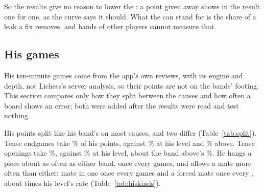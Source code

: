 \documentclass[11pt]{article}
\begin{document}
So the results give no reason to lower the \Discount: a point given away shows in the result one
for one, as the curve says it should. What the \Discount{} can stand for is the share of a leak a fix
removes, and bands of other players cannot measure that.

\begin{table}[h]
\centering
\small\DiscountTable
\caption{The rule's discount fit, over his band's player-games: $\delta$, minus the slope of the
result on the points given away with the rating difference beside them, and its 95\% interval. By
the rule every cause is \emph{too high} against the app's \Discount.}
\label{tab:discount}
\end{table}

\begin{table}[h]
\centering
\scriptsize\TheirsTable
\caption{The discount with the opponent's points (added after the results were read; not part of the
rule): the correlation of the two players' points a game, $\delta$ with the opponent's points on the
same cause beside the player's, and $\delta$ in one fit with both players' points on every partition
cause.}
\label{tab:theirs}
\end{table}

\subsection{His games}

His \ArchiveGames{} ten-minute games come from the app's own reviews, with its engine and depth, not
Lichess's server analysis, so their points are not on the bands' footing. This section compares only
how they split between the causes and how often a board shows an error; both were added after the
results were read and test nothing.

His points split like his band's on most causes, and two differ (Table~\ref{tab:split}). Tense
endgames take \SplitEndgameTenseMine\% of his points, against \SplitEndgameTenseHis\% at his level
and \SplitEndgameTenseAbove\% above. Tense openings take \SplitOpeningTenseMine\%, against
\SplitOpeningTenseHis\% at his level, about the band above's \SplitOpeningTenseAbove\%. He hangs a
piece about as often as either band, once every \ArchiveHangingEvery{} games, and allows a mate more
often than either: mate in one once every \ArchiveMateOneEvery{} games and a forced mate once every
\ArchiveMateNEvery, about \MateRatio{} times his level's rate (Table~\ref{tab:hiskinds}).

\begin{table}[h]
\centering
\small\SplitTable
\caption{How the points given away split between the partition's causes (added after the results
were read; it tests nothing): his games, his band and the band above, with 95\% intervals.}
\label{tab:split}
\end{table}
\end{document}
